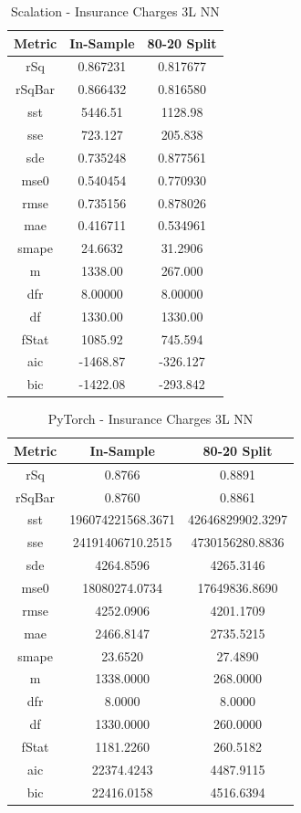 \documentclass{article}
\begin{document}
\begin{table}[H]
\centering
\caption{Scalation - Insurance Charges 3L NN}
\label{tab:Scalation - Insurance Charges 3L NN}
\begin{tabular}{|c|c|c|} \hline 
Metric & In-Sample & 80-20 Split \\ \hline \hline 
rSq &0.867231 & 0.817677 \\ \hline 
rSqBar &0.866432 &      0.816580 \\ \hline 
sst &5446.51 &  1128.98 \\ \hline 
sse &723.127 &  205.838 \\ \hline 
sde &0.735248 & 0.877561 \\ \hline 
mse0 &0.540454 &        0.770930 \\ \hline 
rmse &0.735156 &        0.878026 \\ \hline 
mae &0.416711 & 0.534961 \\ \hline 
smape &24.6632 &        31.2906 \\ \hline 
m &1338.00 &    267.000 \\ \hline 
dfr &8.00000 &  8.00000 \\ \hline 
df &1330.00 &   1330.00 \\ \hline 
fStat &1085.92 &        745.594 \\ \hline 
aic &-1468.87 & -326.127 \\ \hline 
bic &-1422.08 & -293.842 \\ \hline 
\end{tabular}
\end{table}

\begin{table}[H]
\centering
\caption{PyTorch - Insurance Charges 3L NN}
\label{tab:PyTorch - Insurance Charges 3L NN}
\begin{tabular}{|c|c|c|}\hline
Metric & In-Sample & 80-20 Split \\ \hline \hline
rSq & 0.8766 & 0.8891 \\ \hline
rSqBar & 0.8760 & 0.8861 \\ \hline
sst & 196074221568.3671 & 42646829902.3297 \\ \hline
sse & 24191406710.2515 & 4730156280.8836 \\ \hline
sde & 4264.8596 & 4265.3146 \\ \hline
mse0 & 18080274.0734 & 17649836.8690 \\ \hline
rmse & 4252.0906 & 4201.1709 \\ \hline
mae & 2466.8147 & 2735.5215 \\ \hline
smape & 23.6520 & 27.4890 \\ \hline
m & 1338.0000 & 268.0000 \\ \hline
dfr & 8.0000 & 8.0000 \\ \hline
df & 1330.0000 & 260.0000 \\ \hline
fStat & 1181.2260 & 260.5182 \\ \hline
aic & 22374.4243 & 4487.9115 \\ \hline
bic & 22416.0158 & 4516.6394 \\ \hline
\end{tabular}
\end{table}
\end{document}
